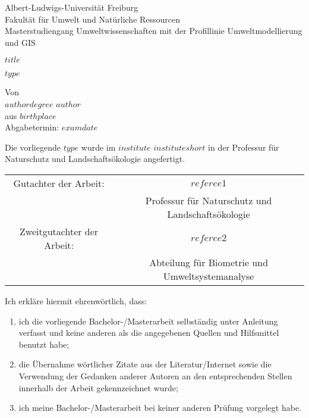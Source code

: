 \documentclass[a4paper,11pt]{article}
\newcommand{\thesistype}{$type$}
\begin{document}
\thispagestyle{empty}
\begin{center}
  {\Large{Albert-Ludwigs-Universität Freiburg \\
  Fakultät für Umwelt und Natürliche Ressourcen \\
  Masterstudiengang Umweltwissenschaften mit der Profillinie Umweltmodellierung und GIS}} \vspace*{\fill}

  \Large{$title$} \\ \vspace*{\fill}

  \Large{\thesistype{}} \\ \vspace*{\fill}

  \Large{Von} \\\vspace{0.5cm}
  \Large{$authordegree$ $author$} \\
  \Large{aus $birthplace$} \\
  \Large{Abgabetermin: $examdate$}

\end{center}
\newpage\null\thispagestyle{empty}\newpage


\newpage
\thispagestyle{empty}
Die vorliegende \thesistype{} wurde im $institute$ $instituteshort$ in der Professur für Naturschutz und Landschaftsökologie angefertigt.

\vspace*{\fill}
\begin{tabular}{ c c }
Gutachter der Arbeit:       &  $referee1$ \\
                            &  Professur für Naturschutz und Landschaftsökologie    \\
Zweitgutachter der Arbeit:  &  $referee2$ \\
                            &  Abteilung für Biometrie und Umweltsystemanalyse \\
\end{tabular}


Ich erkläre hiermit ehrenwörtlich, dass:

\begin{enumerate}
    \item   ich die vorliegende Bachelor-/Masterarbeit selbständig unter Anleitung verfasst und keine anderen als die angegebenen Quellen und Hilfsmittel benutzt habe;
    \item   die Übernahme wörtlicher Zitate aus der Literatur/Internet sowie die Verwendung der Gedanken anderer Autoren an den entsprechenden Stellen innerhalb der Arbeit gekennzeichnet wurde;
    \item	ich meine Bachelor-/Masterarbeit bei keiner anderen Prüfung vorgelegt habe.

\end{enumerate}
\end{document}
